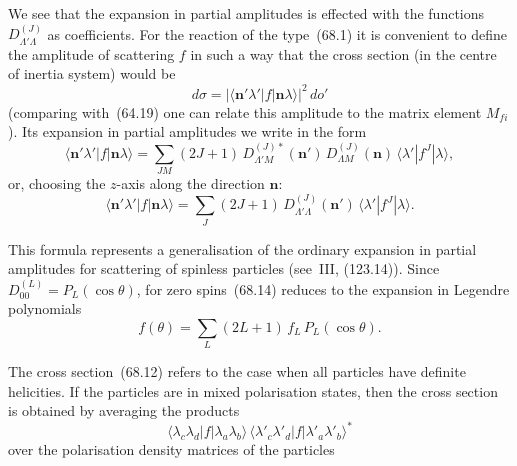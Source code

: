 We see that the expansion in partial amplitudes is effected with the functions $D^{(J)}_{\Lambda'\Lambda}$ as coefficients. For the reaction of the type~(68.1) it is convenient to define the amplitude of scattering $f$ in such a way that the cross section (in the centre of inertia system) would be
\begin{equation}
d\sigma = |\langle\mathbf{n}'\lambda'|f|\mathbf{n}\lambda\rangle|^2\,do'
\tag{68.12}
\end{equation}
(comparing with~(64.19) one can relate this amplitude to the matrix element $M_{fi}$). Its expansion in partial amplitudes we write in the form
\begin{equation}
\langle\mathbf{n}'\lambda'|f|\mathbf{n}\lambda\rangle = \sum_{JM}(2J+1)\,D^{(J)*}_{\Lambda'M}(\mathbf{n}')\,D^{(J)}_{\Lambda M}(\mathbf{n})\,\langle\lambda'|f^J|\lambda\rangle,
\tag{68.13}
\end{equation}
or, choosing the $z$-axis along the direction $\mathbf{n}$:
\begin{equation}
\langle\mathbf{n}'\lambda'|f|\mathbf{n}\lambda\rangle = \sum_J(2J+1)\,D^{(J)}_{\Lambda'\Lambda}(\mathbf{n}')\,\langle\lambda'|f^J|\lambda\rangle.
\tag{68.14}
\end{equation}

This formula represents a generalisation of the ordinary expansion in partial amplitudes for scattering of spinless particles (see~III, (123.14)). Since $D^{(L)}_{00} = P_L(\cos\theta)$, for zero spins~(68.14) reduces to the expansion in Legendre polynomials
\[
f(\theta) = \sum_L(2L+1)\,f_L\,P_L(\cos\theta).
\]

The cross section~(68.12) refers to the case when all particles have definite helicities. If the particles are in mixed polarisation states, then the cross section is obtained by averaging the products
\[
\langle\lambda_c\lambda_d|f|\lambda_a\lambda_b\rangle\,\langle\lambda'_c\lambda'_d|f|\lambda'_a\lambda'_b\rangle^*
\]
over the polarisation density matrices of the particles

